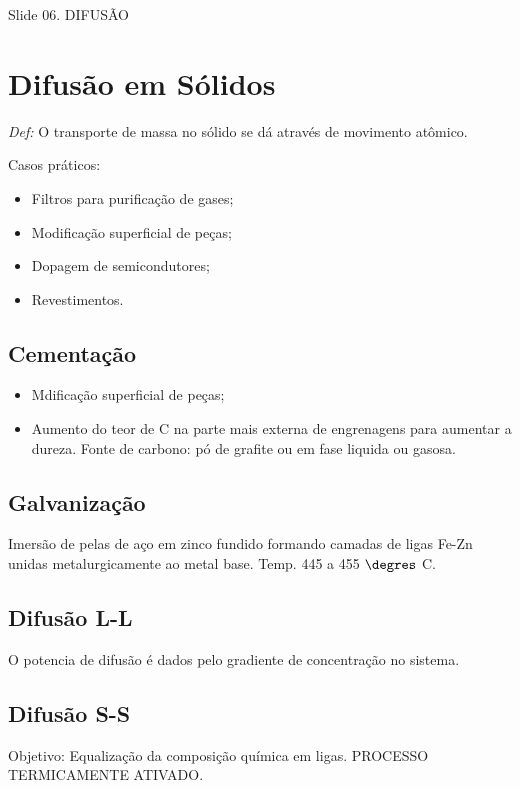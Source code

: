 


{\large Slide 06. DIFUSÃO}


\section{Difusão em Sólidos}

\textit{Def:} O transporte de massa no sólido se dá através de movimento atômico.

Casos práticos:

\begin{itemize}
	\item Filtros para purificação de gases;
	\item Modificação superficial de peças;
	\item Dopagem de semicondutores;
	\item Revestimentos.
\end{itemize}



\subsection{Cementação}

\begin{itemize}
	\item Mdificação superficial de peças;
	\item Aumento do teor de C na parte mais externa de engrenagens para aumentar a dureza. Fonte de carbono: pó de grafite ou em fase liquida ou gasosa.
\end{itemize}


\subsection{Galvanização}


Imersão de pelas de aço em zinco fundido formando camadas de ligas Fe-Zn unidas metalurgicamente ao metal base. Temp. 445 a 455 $\degres$ C.

\subsection{Difusão L-L}
O potencia de difusão é dados pelo gradiente de concentração no sistema.


\subsection{Difusão S-S}

Objetivo: Equalização da composição química em ligas. PROCESSO TERMICAMENTE ATIVADO.

